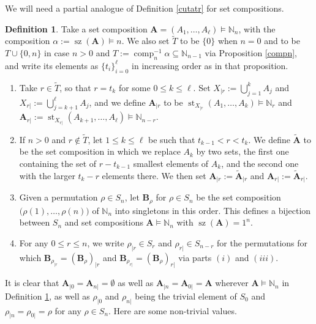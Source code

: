 \documentclass{article}
\theoremstyle{definition}
\newtheorem{defn}[thm]{Definition}
\begin{document}
We will need a partial analogue of Definition \ref{cutatr} for set compositions.
\begin{defn}
Take a set composition $\mathbf{A}=(A_{1},\ldots,A_{\ell})\vDash\mathbb{N}_{n}$, with the composition $\alpha:=\operatorname{sz}(\mathbf{A}) \vDash n$. We also set $\tilde{T}$ to be $\{0\}$ when $n=0$ and to be $T\cup\{0,n\}$ in case $n>0$ and $T:=\operatorname{comp}_{n}^{-1}\alpha\subseteq\mathbb{N}_{n-1}$ via Proposition \ref{compn}, and write its elements as $\{t_{i}\}_{i=0}^{\ell}$ in increasing order as in that proposition.
\begin{enumerate}[$(i)$]
\item Take $r\in\tilde{T}$, so that $r=t_{k}$ for some $0 \leq k\leq\ell$. Set $X_{|r}:=\bigcup_{j=1}^{k}A_{j}$ and $X_{r|}:=\bigcup_{j=k+1}^{\ell}A_{j}$, and we define $\mathbf{A}_{|r}$ to be $\operatorname{st}_{X_{|r}}(A_{1},\ldots,A_{k})\vDash\mathbb{N}_{r}$ and $\mathbf{A}_{r|}:=\operatorname{st}_{X_{r|}}(A_{k+1},\ldots,A_{\ell})\vDash\mathbb{N}_{n-r}$.
\item If $n>0$ and $r\not\in\tilde{T}$, let $1 \leq k\leq\ell$ be such that $t_{k-1}<r<t_{k}$. We define $\tilde{\mathbf{A}}$ to be the set composition in which we replace $A_{k}$ by two sets, the first one containing the set of $r-t_{k-1}$ smallest elements of $A_{k}$, and the second one with the larger $t_{k}-r$ elements there. We then set $\mathbf{A}_{|r}:=\tilde{\mathbf{A}}_{|r}$ and $\mathbf{A}_{r|}:=\tilde{\mathbf{A}}_{r|}$.
\item Given a permutation $\rho \in S_{n}$, let $\mathbf{B}_{\rho}$ for $\rho \in S_{n}$ be the set composition $\big(\rho(1),\ldots,\rho(n)\big)$ of $\mathbb{N}_{n}$ into singletons in this order. This defines a bijection between $S_{n}$ and set compositions $\mathbf{A}\vDash\mathbb{N}_{n}$ with $\operatorname{sz}(\mathbf{A})=1^{n}$.
\item For any $0 \leq r \leq n$, we write $\rho_{|r} \in S_{r}$ and $\rho_{r|} \in S_{n-r}$ for the permutations for which $\mathbf{B}_{\rho_{|r}}=(\mathbf{B}_{\rho})_{|r}$ and $\mathbf{B}_{\rho_{r|}}=(\mathbf{B}_{\rho})_{r|}$ via parts $(i)$ and $(iii)$.
\end{enumerate} \label{setwithr}
\end{defn}
It is clear that $\mathbf{A}_{|0}=\mathbf{A}_{n|}=\emptyset$ as well as $\mathbf{A}_{|n}=\mathbf{A}_{0|}=\mathbf{A}$ wherever $\mathbf{A}\vDash\mathbb{N}_{n}$ in Definition \ref{setwithr}, as well as $\rho_{|0}$ and $\rho_{n|}$ being the trivial element of $S_{0}$ and $\rho_{|n}=\rho_{0|}=\rho$ for any $\rho \in S_{n}$. Here are some non-trivial values.
\end{document}
